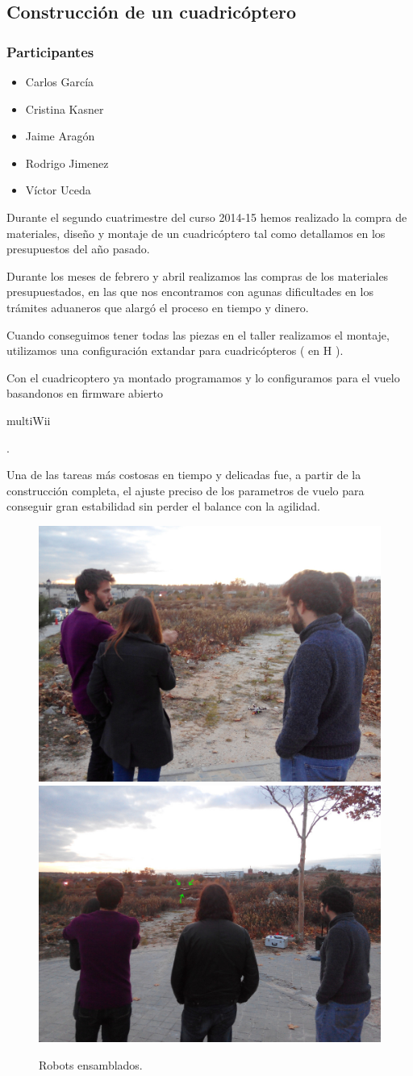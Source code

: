\documentclass[12pt,twoside]{report}
\begin{document}
\subsection{Construcción de un cuadricóptero}
\subsubsection{Participantes}

\begin{itemize}


\item Carlos García
\item Cristina Kasner
\item Jaime Aragón
\item Rodrigo Jimenez
\item Víctor Uceda
\end{itemize}

Durante el segundo cuatrimestre del curso 2014-15 hemos realizado la compra de materiales, diseño y montaje de un cuadricóptero tal como detallamos en los presupuestos del año pasado.

Durante los meses de febrero y abril realizamos las compras de los materiales presupuestados, en las que nos encontramos con agunas dificultades en los trámites aduaneros que alargó el proceso en tiempo y dinero.

Cuando conseguimos tener todas las piezas en el taller realizamos el montaje, utilizamos una configuración extandar para cuadricópteros ( en H ).

Con el cuadricoptero ya montado programamos y lo configuramos para el vuelo basandonos en firmware abierto \begin{em}multiWii\end{em}.

Una de las tareas más costosas en tiempo y delicadas fue, a partir de la construcción completa, el ajuste preciso de los parametros de vuelo para conseguir gran estabilidad sin perder el balance con la agilidad.

\begin{figure}[hbtp]
\centerline{\includegraphics[width=0.4\linewidth]{fotos/2015-12-11_PruebaVuelo_JaimeCrisPabloRafa.jpg} \includegraphics[width=0.4\linewidth]{fotos/2015-12-11_PruebaVuelo_CrisJaimeRafaPablo.jpg}}
\caption*{
Robots ensamblados.
}
\end{figure}
\end{document}
